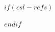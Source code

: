 
$if(csl-refs)$
  \newlength{\cslhangindent}
  \setlength{\cslhangindent}{1.5em}
  \newlength{\csllabelwidth}
  \setlength{\csllabelwidth}{3em}
  \newlength{\cslentryspacingunit} %
  \setlength{\cslentryspacingunit}{\parskip}
  \newenvironment{CSLReferences}[2] %
   {%
    \setlength{\parindent}{0pt}
    \ifodd #1
      \let\oldpar\par
      \def\par{\hangindent=\cslhangindent\oldpar}
    \fi
    \setlength{\parskip}{#2\cslentryspacingunit}
   }%
   {}
  \usepackage{calc}
  \newcommand{\CSLBlock}[1]{#1\hfill\break}
  \newcommand{\CSLLeftMargin}[1]{\parbox[t]{\csllabelwidth}{#1}}
  \newcommand{\CSLRightInline}[1]{\parbox[t]{\linewidth - \csllabelwidth}{#1}\break}
  \newcommand{\CSLIndent}[1]{\hspace{\cslhangindent}#1}
$endif$

